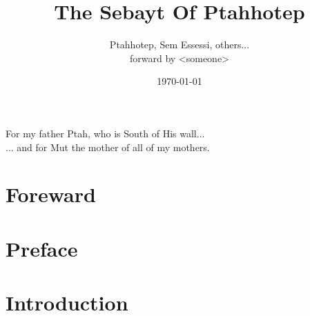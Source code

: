 \documentclass[a4paper,pagesize,8pt,pointlessnumbers,normalheadings]{book}
\title{The Sebayt Of Ptahhotep}
\author{Ptahhotep, Sem Essessi, others...\\forward by <someone>}
\date{\today}
\begin{document}
\maketitle


\vspace*{\fill}
\begin{center}
For my father Ptah, who is South of His wall...\\
\vspace{15mm}
... and for Mut the mother of all of my mothers.
\end{center}
\vspace*{\fill}

\tableofcontents

\chapter*{Foreward}



\chapter*{Preface}



\chapter*{Introduction}


\end{document}
